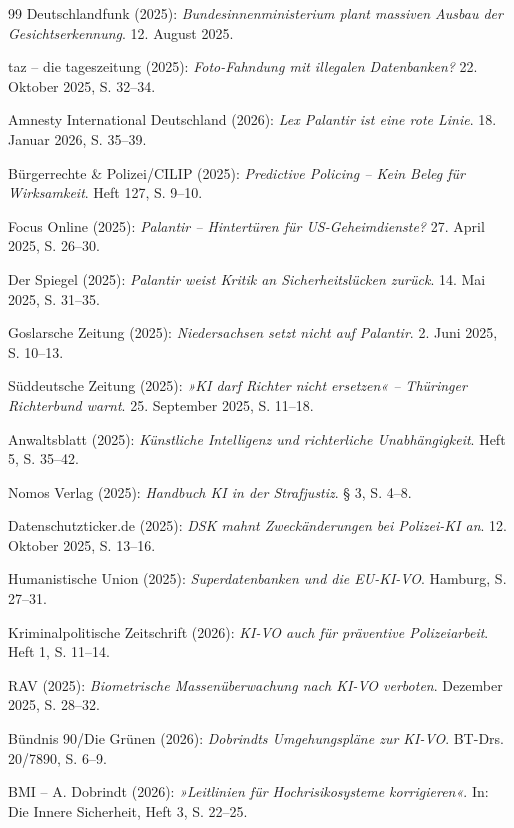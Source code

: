\documentclass[12pt,a4paper]{article}
\begin{document}
\begin{thebibliography}{99}
		 Deutschlandfunk (2025): \emph{Bundesinnenministerium plant massiven Ausbau der Gesichtserkennung}. 12. August 2025.
		
		 taz – die tageszeitung (2025): \emph{Foto-Fahndung mit illegalen Datenbanken?} 22. Oktober 2025, S. 32–34.
		
		 Amnesty International Deutschland (2026): \emph{Lex Palantir ist eine rote Linie}. 18. Januar 2026, S. 35–39.
		
		 Bürgerrechte \& Polizei/CILIP (2025): \emph{Predictive Policing – Kein Beleg für Wirksamkeit}. Heft 127, S. 9–10.
		
		 Focus Online (2025): \emph{Palantir – Hintertüren für US-Geheimdienste?} 27. April 2025, S. 26–30.
		
		 Der Spiegel (2025): \emph{Palantir weist Kritik an Sicherheitslücken zurück}. 14. Mai 2025, S. 31–35.
		
		 Goslarsche Zeitung (2025): \emph{Niedersachsen setzt nicht auf Palantir}. 2. Juni 2025, S. 10–13.
		
		 Süddeutsche Zeitung (2025): \emph{»KI darf Richter nicht ersetzen« – Thüringer Richterbund warnt}. 25. September 2025, S. 11–18.
		
		 Anwaltsblatt (2025): \emph{Künstliche Intelligenz und richterliche Unabhängigkeit}. Heft 5, S. 35–42.
		
		 Nomos Verlag (2025): \emph{Handbuch KI in der Strafjustiz}. § 3, S. 4–8.
		
		 Datenschutzticker.de (2025): \emph{DSK mahnt Zweckänderungen bei Polizei-KI an}. 12. Oktober 2025, S. 13–16.
		
		 Humanistische Union (2025): \emph{Superdatenbanken und die EU-KI-VO}. Hamburg, S. 27–31.
		
		 Kriminalpolitische Zeitschrift (2026): \emph{KI-VO auch für präventive Polizeiarbeit}. Heft 1, S. 11–14.
		
		 RAV (2025): \emph{Biometrische Massenüberwachung nach KI-VO verboten}. Dezember 2025, S. 28–32.
		
		 Bündnis 90/Die Grünen (2026): \emph{Dobrindts Umgehungspläne zur KI-VO}. BT-Drs. 20/7890, S. 6–9.
		
		 BMI – A. Dobrindt (2026): \emph{»Leitlinien für Hochrisikosysteme korrigieren«}. In: Die Innere Sicherheit, Heft 3, S. 22–25.
		

\end{thebibliography}
\end{document}
